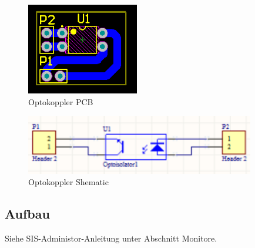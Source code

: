\begin{figure}[H]
\centering
\includegraphics[keepaspectratio=true, height=4cm]{images/rpi/Optokoppler_PCB.png}
\caption{Optokoppler PCB}
\label{fig:report_hardware_OptPCB}
\end{figure}
\begin{figure}[H]
\centering
\includegraphics[keepaspectratio=true, width=10cm]{images/rpi/Optokoppler_Schematic.png}
\caption{Optokoppler Shematic}
\label{fig:report_hardware_OptSche}
\end{figure}

\subsection{Aufbau}

Siehe SIS-Administor-Anleitung unter Abschnitt Monitore.